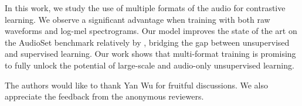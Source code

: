 \documentclass{article}
\begin{document}
In this work, we study the use of multiple formats of the audio for contrastive learning. We observe a significant advantage when training with both raw waveforms and log-mel spectrograms. Our model improves the state of the art on the AudioSet benchmark relatively by , bridging the gap between unsupervised and supervised learning. Our work shows that multi-format training is promising to fully unlock the potential of large-scale and audio-only unsupervised learning.




































\begin{ack}
The authors would like to thank Yan Wu for fruitful discussions. We also appreciate the feedback from the anonymous reviewers.
\end{ack}









\end{document}
